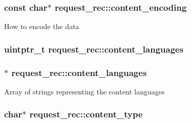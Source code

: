 \subsubsection[{\texorpdfstring{content\+\_\+encoding}{content_encoding}}]{\setlength{\rightskip}{0pt plus 5cm}const char$\ast$ request\+\_\+rec\+::content\+\_\+encoding}\hypertarget{structrequest__rec_afc389b729286c795c92309374e3939a0}{}\label{structrequest__rec_afc389b729286c795c92309374e3939a0}
How to encode the data 
\subsubsection[{\texorpdfstring{content\+\_\+languages}{content_languages}}]{\setlength{\rightskip}{0pt plus 5cm}uintptr\+\_\+t request\+\_\+rec\+::content\+\_\+languages}\hypertarget{structrequest__rec_a878515c6672309122d82260e34920946}{}\label{structrequest__rec_a878515c6672309122d82260e34920946}
\subsubsection[{\texorpdfstring{content\+\_\+languages}{content_languages}}]{$\ast$ request\+\_\+rec\+::content\+\_\+languages}\hypertarget{structrequest__rec_a081b966b6fd4bff3df9bf099c79bce2c}{}\label{structrequest__rec_a081b966b6fd4bff3df9bf099c79bce2c}
Array of strings representing the content languages 
\subsubsection[{\texorpdfstring{content\+\_\+type}{content_type}}]{\setlength{\rightskip}{0pt plus 5cm}char$\ast$ request\+\_\+rec\+::content\+\_\+type}\hypertarget{structrequest__rec_a539f8aba497328ed3e9c4628b0b7b4b0}{}\label{structrequest__rec_a539f8aba497328ed3e9c4628b0b7b4b0}
